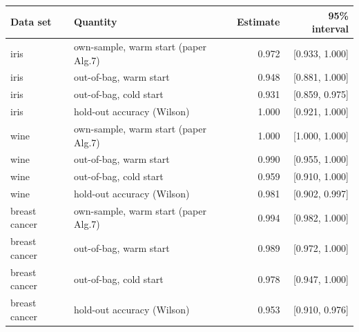 \begin{tabular}{llrr}\toprule
Data set & Quantity & Estimate & 95\% interval\\\midrule
iris & own-sample, warm start (paper Alg.7) & 0.972 & [0.933, 1.000]\\
iris & out-of-bag, warm start & 0.948 & [0.881, 1.000]\\
iris & out-of-bag, cold start & 0.931 & [0.859, 0.975]\\
iris & hold-out accuracy (Wilson) & 1.000 & [0.921, 1.000]\\
\midrule
wine & own-sample, warm start (paper Alg.7) & 1.000 & [1.000, 1.000]\\
wine & out-of-bag, warm start & 0.990 & [0.955, 1.000]\\
wine & out-of-bag, cold start & 0.959 & [0.910, 1.000]\\
wine & hold-out accuracy (Wilson) & 0.981 & [0.902, 0.997]\\
\midrule
breast cancer & own-sample, warm start (paper Alg.7) & 0.994 & [0.982, 1.000]\\
breast cancer & out-of-bag, warm start & 0.989 & [0.972, 1.000]\\
breast cancer & out-of-bag, cold start & 0.978 & [0.947, 1.000]\\
breast cancer & hold-out accuracy (Wilson) & 0.953 & [0.910, 0.976]\\
\bottomrule\end{tabular}
